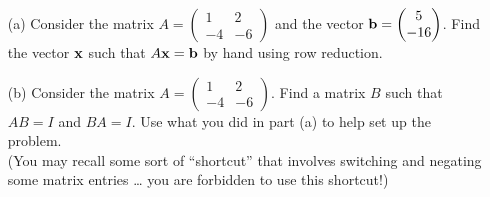 \begin{problem}
    \begin{enumerate}
        \item[(a)] Consider the matrix $A = \begin{pmatrix}
                1&2\\-4&-6\end{pmatrix}$ and the vector ${\bf b} = \begin{pmatrix}
                5\\-16\end{pmatrix}$.
            Find the vector ${\bf x}$ such that $A{\bf x} = {\bf b}$ by hand using row reduction.  
        \item[(b)] Consider the matrix $A = \begin{pmatrix} 1 & 2 \\ -4 & -6
            \end{pmatrix}$.  Find a matrix $B$ such that $AB = I$ and $BA = I$.  Use what
            you did in part (a) to help set up the problem. \\ (You may recall some sort
            of ``shortcut'' that involves switching and negating some matrix entries \dots
            you are forbidden to use this shortcut!)
    \end{enumerate}
\end{problem}

